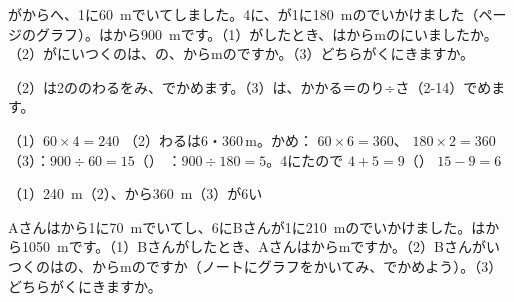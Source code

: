 \begin{reidai}[2\R{本}{ほん}の\R{線}{せん}が\R{交}{まじ}わる\R{所}{ところ}を\R{読}{よ}む]
がからへ、1に\qty{60}{m}でいてしました。4に、が1に\qty{180}{m}のでいかけました（\pageref{bk:3-4:katachi}ページのグラフ）。はから\qty{900}{m}です。（1）がしたとき、はからmのにいましたか。（2）がにいつくのは、の、からmのですか。（3）どちらがくにきますか。\par
\kangaekata（2）は2ののわるをみ、でかめます。（3）は、かかる＝のり÷さ（2-14）でめます。\par
\bkthreSi（1）\nobreak $60\times4=240$
\bkthreI（2）\nobreak {}わるは6・360\,m。かめ： $60\times6=360$、 $180\times2=360$
\bkthreI（3）\nobreak {}：$900\div60=15$（）
\bkthreJ {}：$900\div180=5$。4にたので $4+5=9$（）
\bkthreJ $15-9=6$\par
\bkthreK（1）\nobreak \qty{240}{m}\quad（2）、から\qty{360}{m}\quad（3）\nobreak {}が6い
\end{reidai}

\begin{jibun}
Aさんはから1に\qty{70}{m}でいてし、6にBさんが1に\qty{210}{m}のでいかけました。はから\qty{1050}{m}です。（1）Bさんがしたとき、Aさんはからmですか。（2）Bさんがいつくのはの、からmのですか（ノートにグラフをかいてみ、でかめよう）。（3）どちらがくにきますか。
\end{jibun}


